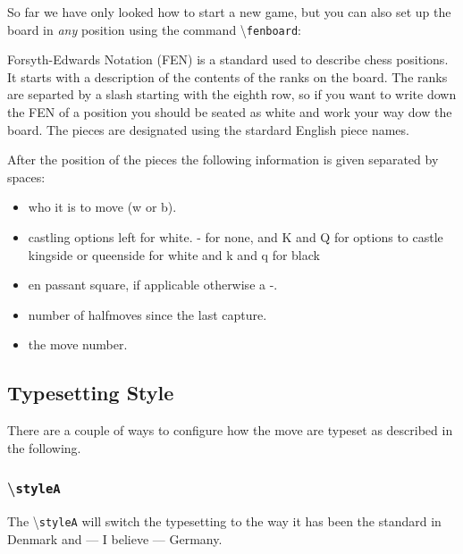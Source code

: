 \documentclass[10pt]{article}
\makeatletter
\renewcommand\showboard{\print@board}
\let\ORIshowboard\showboard
\renewcommand\showboard{%
    \makebox[8\squarelength]{%
    \rule{0pt}{9\squarelength}%
    \begin{postscript}%
    [trim = \squarelength{} 0pt \squarelength{} 0pt]
    \ORIshowboard
    \end{postscript}}}
\newcommand{\command}[1]{\textbackslash\texttt{#1}}
\makeatother
\begin{document}
So far we have only looked how to start a new game, but you can also
set up the board in \emph{any} position using the command
\command{fenboard}:

Forsyth-Edwards Notation (FEN) is a standard used to describe chess
positions. It starts with a description of the contents of the ranks
on the board. The ranks are separted by a slash starting with the
eighth row, so if you want to write down the FEN of a
position you should be seated as white and work your way dow the
board. The pieces are designated using the stardard English piece
names.

After the position of the pieces the following information is given
separated by spaces:
\begin{itemize}
\item who it is to move (w or b).
\item castling options left for white. - for none, and K and Q for
  options to castle kingside or queenside for white and k and q for black
\item en passant square, if applicable otherwise a -.
\item number of halfmoves since the last capture.
\item the move number.
\end{itemize}


\begin{LTXexample}

\mbox{}
\bigskip

\showboard



\end{LTXexample}


\subsection{Typesetting Style}
\label{sec:typesetting-style}

There are a couple of ways to configure how the move are typeset as
described in the following.


\subsubsection{\command{styleA}}
\label{sec:stylea}

The \command{styleA} will switch the typesetting to the way it has
been the standard in Denmark and --- I believe --- Germany.
\end{document}
